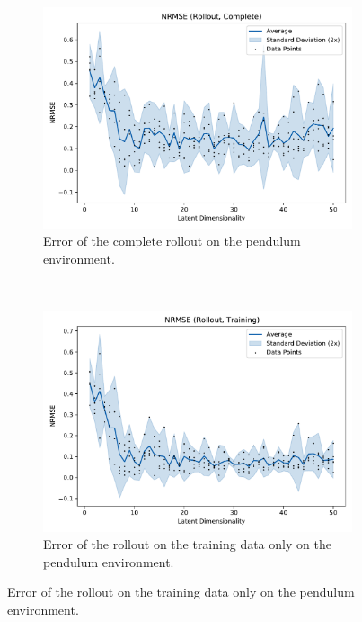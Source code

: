 			\begin{figure}
				\centering
				\begin{subfigure}{0.7\linewidth}
					\centering
					\includegraphics[width=\linewidth]{figures/results/pendulum/latent-dim/comparison-rmse-rollout-normalized-mean-vs-latent-dim.pdf}
					\caption[Error of the complete rollout on the pendulum environment]{Error of the complete rollout on the pendulum environment.}
					\label{fig:pendulumRmseComplete}
				\end{subfigure} \\
				\begin{subfigure}{0.5\linewidth}
					\centering
					\includegraphics[width=\linewidth]{figures/results/pendulum/latent-dim/comparison-rmse-rollout-train-normalized-mean-vs-latent-dim.pdf}
					\caption[Error of the training rollout on the pendulum environment]{Error of the rollout on the training data only on the pendulum environment.}

\end{subfigure}
\end{figure}
